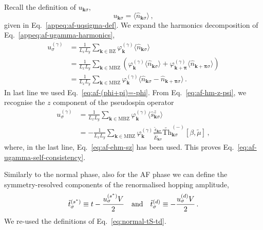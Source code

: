 \begin{tabproof}
	
	Recall the definition of $u_{\mathbf{k}\sigma}$,
	\[
	u_{\mathbf{k}\sigma} = \langle \hat n_{\mathbf{k}\sigma} \rangle \, ,
	\]
	given in Eq.~\eqref{appeq:af-uqsigma-def}. We expand the harmonics decomposition of Eq.~\eqref{appeq:af-ugamma-harmonics},
	\[
	\begin{aligned}
		u^{(\gamma)}_\sigma &= \frac{1}{L_x L_y} \sum_{\mathbf{k}\in\mathrm{BZ}} \varphi_\mathbf{k}^{(\gamma)}
		\langle
		\hat n_{\mathbf{k}\sigma}
		\rangle \\
		&= \frac{1}{L_x L_y} \sum_{\mathbf{k}\in\mathrm{MBZ}} \left(
		\varphi_\mathbf{k}^{(\gamma)}
		\langle
		\hat n_{\mathbf{k}\sigma}
		\rangle
		+
		\varphi_{\mathbf{k}+\bm{\pi}}^{(\gamma)}
		\langle
		\hat n_{\mathbf{k}+\bm{\pi}\sigma}
		\rangle
		\right) \\
		&= \frac{1}{L_x L_y} \sum_{\mathbf{k}\in\mathrm{MBZ}} \varphi_\mathbf{k}^{(\gamma)}
		\langle
		\hat n_{\mathbf{k}\sigma}
		-
		\hat n_{\mathbf{k}+\bm{\pi}\sigma}
		\rangle \, .
	\end{aligned}
	\]
	In last line we used Eq.~\eqref{eq:af-(phi+pi)=-phi}. From Eq.~\eqref{eq:af-hm-z-psi}, we recognise the $z$ component of the pseudospin operator
	\begin{align}
		u^{(\gamma)}_\sigma &= \frac{1}{L_x L_y} \sum_{\mathbf{k}\in\mathrm{MBZ}} \varphi_\mathbf{k}^{(\gamma)}
		\langle
		\hat s_{\mathbf{k}\sigma}^z
		\rangle \nonumber\\
		&= -\frac{1}{L_x L_y} \sum_{\mathbf{k}\in\mathrm{MBZ}} \varphi_\mathbf{k}^{(\gamma)}
		\frac{\tilde{\epsilon}_{\mathbf{k}\sigma}}{\tilde{E}_{\mathbf{k}\sigma}} \tilde{\mathrm{Th}}_{\mathbf{k}\sigma}^{(-)}[\beta,\tilde{\mu}] \, , \label{eq:af-ugamma-chain}
	\end{align}
	where, in the last line, Eq.~\eqref{eq:af-ehm-sz} has been used. This proves Eq.~\eqref{eq:af-ugamma-self-consistency}.
\end{tabproof}

Similarly to the normal phase, also for the AF phase we can define the symmetry-resolved components of the renormalised hopping amplitude,
\begin{equation}\label{appeq:af-tS-td}
	\tilde{t}^{(s^*)}_\sigma \equiv t - \frac{u_\sigma^{(s^*)} V}{2}
	\qq{and}
	\tilde{t}^{(d)}_\sigma \equiv - \frac{u_\sigma^{(d)} V}{2} \, .
\end{equation}
We re-used the definitions of Eq.~\eqref{eq:normal-tS-td}.

